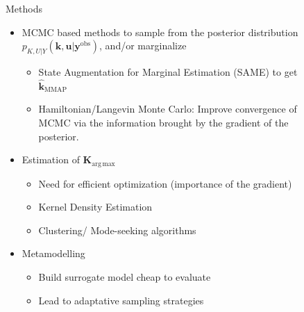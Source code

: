 \documentclass{beamer}
\newlength{\sepwid}
\newlength{\thirdcolwid}
\DeclareMathOperator*{\argmax}{arg\,max}
\newcommand{\yobs}{\bm{y}^{\mathrm{obs}}}
\newcommand{\kest}{\hat{\bm{k}}}
\begin{document}
\begin{frame}[t]
\begin{columns}[t]
\begin{column}{\thirdcolwid}
  


\begin{block}{Methods}
  \begin{itemize}
  \item \alert{MCMC based methods} to sample from the posterior distribution $p_{K,U|Y}(\bm{k},\bm{u}|\yobs)$, and/or marginalize
    \begin{itemize}
    \item State Augmentation for Marginal Estimation (SAME) \cite{doucet_marginal_2002} to get $\kest_{\mathrm{MMAP}}$
    \item Hamiltonian/Langevin Monte Carlo: Improve convergence of MCMC via the information brought by the gradient of the posterior.
    \end{itemize}
  \item Estimation of \alert{$\bm{K}_{\argmax}$}
    \begin{itemize}
    \item Need for efficient optimization (importance of the gradient)
    \item Kernel Density Estimation
    \item Clustering/ Mode-seeking algorithms
    \end{itemize}


  \item Metamodelling
\begin{itemize}
  \item Build surrogate model cheap to evaluate
  \item Lead to adaptative sampling strategies
  \end{itemize}
  \end{itemize}
\end{block}


\end{column} %

\begin{column}{\sepwid}\end{column} %

\begin{column}{\thirdcolwid} %



\end{column}
\end{columns}
\end{frame}
\end{document}

